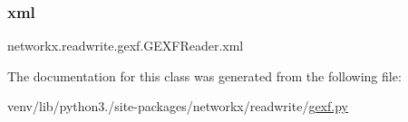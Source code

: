 \subsubsection{\texorpdfstring{xml}{xml}}
{\footnotesize\ttfamily networkx.\+readwrite.\+gexf.\+G\+E\+X\+F\+Reader.\+xml}



The documentation for this class was generated from the following file\+:\begin{DoxyCompactItemize}
\item 
venv/lib/python3./site-\/packages/networkx/readwrite/\hyperlink{gexf_8py}{gexf.\+py}\end{DoxyCompactItemize}
